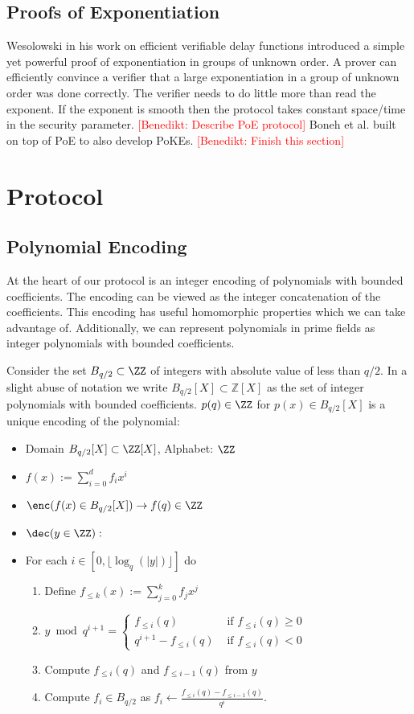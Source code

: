 \documentclass{article}
\theoremstyle{definition}
\newcommand{\benedikt}[1]{{\textcolor{red}{[Benedikt: #1]}}}
\newcommand{\benedikt}[1]{}
\begin{document}
\fi 

\subsection{Proofs of Exponentiation}
Wesolowski \cite{EC:Wesolowski19} in his work on efficient verifiable delay functions introduced a simple yet powerful proof of exponentiation in groups of unknown order. A prover can efficiently convince a verifier that a large exponentiation in a group of unknown order was done correctly. The verifier needs to do little more than read the exponent. If the exponent is smooth then the protocol takes constant space/time in the security parameter.
\benedikt{Describe PoE protocol}
Boneh et al. \cite{journals/iacr/BonehBF18a} built on top of PoE to also develop PoKEs. \benedikt{Finish this section}
\section{Protocol}
\label{sec:protocol}

\subsection{Polynomial Encoding}
At the heart of our protocol is an integer encoding of polynomials with bounded coefficients. The encoding can be viewed as the integer concatenation of the coefficients. This encoding has useful homomorphic properties which we can take advantage of. Additionally, we can represent polynomials in prime fields as integer polynomials with bounded coefficients.

	Consider the set $B_{q/2} \subset \ZZ$ of integers with absolute value of less than $q/2$. In a slight abuse of notation we write $B_{q/2}[X]\subset \mathbb{Z}[X]$ as the set of integer polynomials with bounded coefficients. $p(q) \in \ZZ$ for $p(x)\in B_{q/2}[X]$ is a unique encoding of the polynomial:
\begin{itemize}
	\item Domain $B_{q/2}[X]\subset \ZZ[X]$, Alphabet: $\ZZ$
	\item 	$f(x):=\sum_{i=0}^{d} f_i x^i$
	\item $\enc(f(x) \in B_{q/2}[X])\rightarrow  f(q) \in \ZZ$
	\item $\dec(y \in \ZZ):$
	\item For each $i \in [0,\lfloor \log_q(|y|)\rfloor]$ do\\
	\begin{enumerate}
		\item Define $f_{\leq k}(x):=\sum_{j=0}^k f_j x^j$
		\item $y \bmod q^{i+1}=\begin{cases} f_{\leq i}(q) &\text{ if } f_{\leq i}(q)\geq 0\\ q^{i+1} - f_{\leq i}(q) &\text{ if } f_{\leq i}(q)<0   \end{cases}$
		\item  Compute $f_{\leq i}(q)$ and $f_{\leq i-1}(q)$ from $y$
		\item  Compute $f_i\in B_{q/2}$ as $f_i \gets \frac{f_{\leq i}(q)-f_{\leq i-1}(q)}{q^i}$.
	\end{enumerate} 
\end{itemize}
\end{document}
